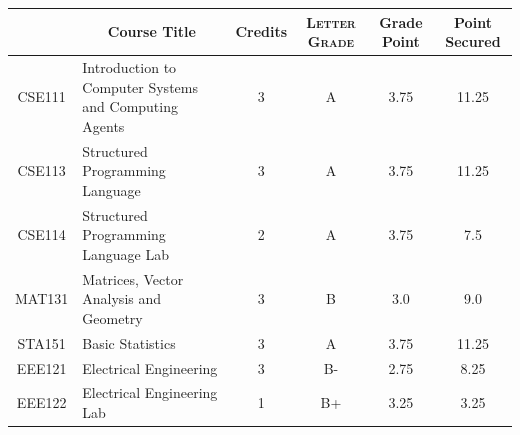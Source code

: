 \documentclass[11pt]{article}
\newcommand*{\numtwo}[1]{\pgfmathprintnumber[
                    fixed, precision=2, fixed zerofill=true]{#1}}
\begin{document}
                \begin{center}
                    \renewcommand{\arraystretch}{1.08}
                    
                \begin{tabular}{|c|l|c|>{\scshape}c|c|c|}
                \hline  \rule[-1ex]{0pt}{3.5ex} {\centering{\bf Course Code}} &  \multicolumn{1}{c|}{\textbf{Course Title}}  & {\bf Credits} & {\bf Letter Grade} & {\bf Grade Point} & {\bf Point Secured}  \\ 
                \hline   CSE111 &  Introduction to Computer Systems and Computing Agents		 & 3 & A & 3.75 & 11.25 \\ %
                \hline   CSE113 &  Structured Programming Language		 & 3 & A & 3.75 & 11.25 \\ %
                \hline   CSE114 &  Structured Programming Language Lab		 & 2 & A & 3.75 & 7.5 \\ %
                \hline   MAT131 &  Matrices, Vector Analysis and Geometry		 & 3 & B & 3.0 & 9.0 \\ %
                \hline   STA151 &  Basic Statistics		 & 3 & A & 3.75 & 11.25 \\ %
                \hline   EEE121 &  Electrical Engineering		 & 3 & B- & 2.75 & 8.25 \\ %
                \hline   EEE122 &  Electrical Engineering Lab		 & 1 & B+ & 3.25 & 3.25 \\ %

\hline                %
                \end{tabular}
                \end{center}
                \renewcommand{\arraystretch}{1.03}
\end{document}
